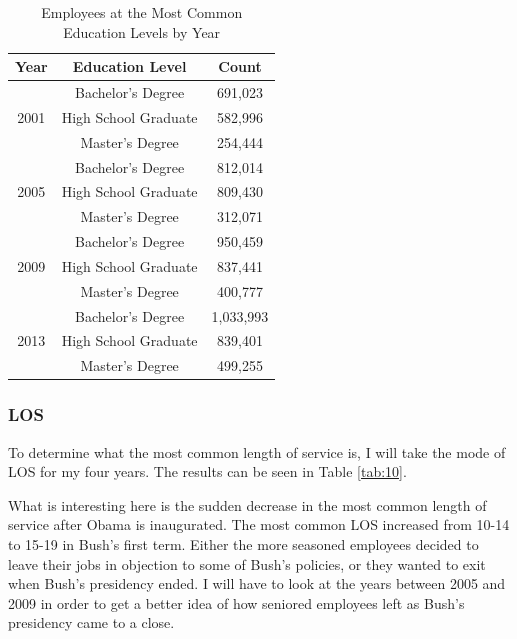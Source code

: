 \documentclass{article}
\begin{document}
            \begin{center}
                \begin{table}
                    \centering
                    \begin{tabular}{ |c|c|c| }
                        \hline
                        Year & Education Level & Count \\
                        \hline
                        & Bachelor's Degree & 691,023 \\
                        2001 & High School Graduate & 582,996 \\
                        & Master's Degree & 254,444 \\
                        \hline
                        & Bachelor's Degree & 812,014 \\
                        2005 & High School Graduate & 809,430 \\
                        & Master's Degree & 312,071 \\
                        \hline
                        & Bachelor's Degree & 950,459 \\
                        2009 & High School Graduate & 837,441 \\
                        & Master's Degree & 400,777 \\
                        \hline
                        & Bachelor's Degree & 1,033,993 \\
                        2013 & High School Graduate & 839,401 \\
                        & Master's Degree & 499,255 \\
                        \hline
                    \end{tabular}
                    \caption{Employees at the Most Common Education Levels by Year}
                    \label{tab:9}
                \end{table}
            \end{center}

        \subsubsection{LOS}
        To determine what the most common length of service is, I will take the mode of LOS for my four years. The results can be seen in Table \ref{tab:10}.
        \par
        What is interesting here is the sudden decrease in the most common length of service after Obama is inaugurated. The most common LOS increased from 10-14 to 15-19 in Bush's first term. Either the more seasoned employees decided to leave their jobs in objection to some of Bush's policies, or they wanted to exit when Bush's presidency ended. I will have to look at the years between 2005 and 2009 in order to get a better idea of how seniored employees left as Bush's presidency came to a close.
\end{document}
